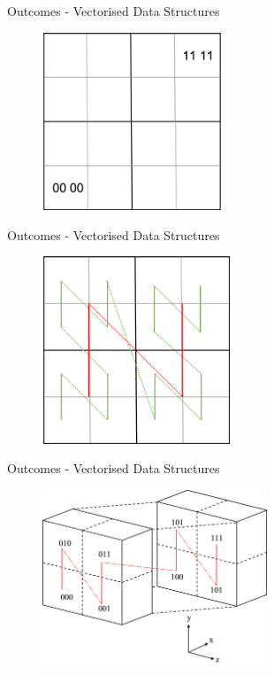\begin{frame}{Outcomes - Vectorised Data Structures}
    \begin{figure}
        \centering
        \includegraphics[width=0.5\textwidth]{assets/morton_finer.png}
    \end{figure}
    \vspace{50pt}
\end{frame}

\begin{frame}{Outcomes - Vectorised Data Structures}
    \begin{figure}
        \centering
        \includegraphics[width=0.5\textwidth]{assets/morton_2d.png}
    \end{figure}
    \vspace{50pt}
\end{frame}

\begin{frame}{Outcomes - Vectorised Data Structures}
    \begin{figure}
        \centering
        \includegraphics[width=0.6\textwidth]{assets/morton_3d.png}
    \end{figure}
\end{frame}

